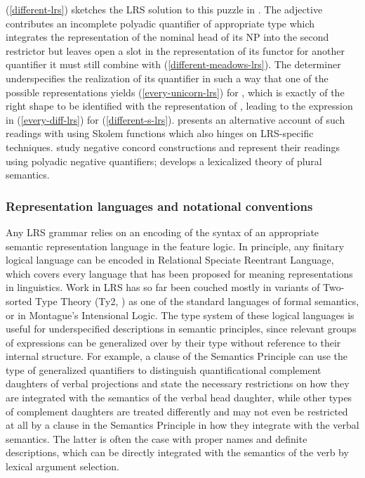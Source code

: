 \documentclass[output=paper,biblatex,babelshorthands,newtxmath,draftmode,colorlinks,citecolor=brown]{langscibook}
\begin{document}
\noindent
(\ref{different-lrs}) sketches the LRS solution to this puzzle in
\citet{Richter2016}. The
adjective  contributes an incomplete polyadic
quantifier of appropriate type which integrates the representation of
the nominal head of its NP into the second restrictor but leaves open
a slot in the representation of its functor for another quantifier it
must still combine with (\ref{different-meadows-lrs}). The determiner
 underspecifies the realization of its quantifier in such
a way that one of the possible representations yields
(\ref{every-unicorn-lrs}) for , which is exactly
of the right shape to be identified with the representation of
, leading to the expression in
(\ref{every-diff-lrs}) for (\ref{different-s-lrs}).
\citet{Lahm2016b} presents an alternative account of such readings
with  using Skolem functions which also hinges on
LRS-specific techniques. \citet{IordachioaiaandRichter2015} study 
negative concord constructions and represent their readings using polyadic negative
quantifiers; \citet{Lahm2018} develops a lexicalized theory
of plural semantics.


\subsubsection{Representation languages and notational conventions}

\enlargethispage{5pt}
Any LRS grammar relies on an encoding of the syntax of an appropriate semantic representation
language in the feature logic. In principle, any finitary logical language can be encoded in
Relational Speciate Reentrant Language, which covers every language that has been proposed for
meaning representations in linguistics. Work in LRS has so far been couched mostly in variants of
Two-sorted Type Theory (Ty2, \citealt{Gallin1975}) as one of the standard languages of formal
semantics, or in Montague's Intensional Logic. The type system of these logical languages is useful
for underspecified descriptions in semantic principles, since relevant groups of expressions can be
generalized over by their type without reference to their internal structure. For example, a clause
of the Semantics Principle can use the type of generalized quantifiers to
distinguish quantificational complement daughters of verbal projections and state the necessary
restrictions on how they are integrated with the semantics of the verbal head daughter, while other
types of complement daughters are treated differently and may not even be restricted at all by a
clause in the Semantics Principle in how they integrate with the verbal semantics. The latter is
often the case with proper names and definite descriptions, which can be directly integrated with
the semantics of the verb by lexical argument selection.
\end{document}
